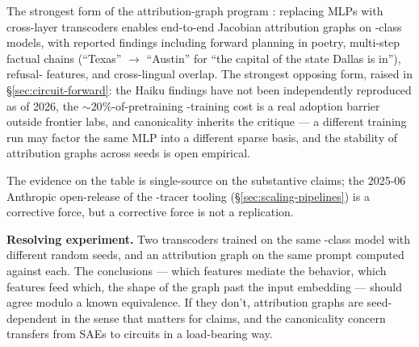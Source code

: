 The strongest form of the attribution-graph program
\citep{lindsey2025-circuit-tracing,lindsey2025-biology}: replacing
MLPs with cross-layer transcoders enables end-to-end Jacobian
attribution graphs on -class models, with reported findings
including forward planning in poetry, multi-step factual chains
(``Texas'' $\to$ ``Austin'' for ``the capital of the state Dallas is
in''), refusal- features, and cross-lingual  overlap.
The strongest opposing form, raised in \S\ref{sec:circuit-forward}:
the Haiku findings have not been independently reproduced as of 2026,
the $\sim\!20\%$-of-pretraining -training cost is a real
adoption barrier outside frontier labs, and  canonicality
inherits the \citet{leask2025-sae-not-canonical,dunefsky2024-transcoders}
critique --- a different  training run may factor the same
MLP into a different sparse basis, and the stability of attribution
graphs across  seeds is open empirical.

The evidence on the table is single-source on the substantive claims;
the 2025-06 Anthropic open-release of the -tracer tooling
(\S\ref{sec:scaling-pipelines}) is a corrective force, but a corrective
force is not a replication.

\textbf{Resolving experiment.} Two transcoders trained on the same
-class model with different random seeds, and an attribution
graph on the same prompt computed against each. The conclusions ---
which features mediate the behavior, which features feed which, the
shape of the graph past the input embedding --- should agree modulo a
known  equivalence. If they don't, attribution graphs are
seed-dependent in the sense that matters for  claims, and the
canonicality concern transfers from SAEs to circuits in a load-bearing
way.

